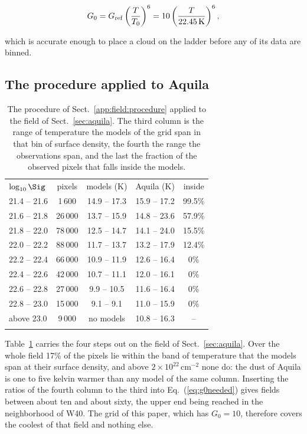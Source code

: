\begin{equation}
   G_0 = G_{\rm ref} \left( \frac{T}{T_0} \right)^{6} = 10 \left( \frac{T}{22.45\,{\rm K}} \right)^{6} ,
\label{eq:g0quick}
\end{equation}

which is accurate enough to place a cloud on the ladder before any of its data are binned.

\subsection{The procedure applied to Aquila}
\label{app:field:aquila}

\begin{table}
\caption{The procedure of Sect.~\ref{app:field:procedure} applied to the field of Sect.~\ref{sec:aquila}.  The third column is the
range of temperature the models of the grid span in that bin of surface density, the fourth the range the observations span, and
the last the fraction of the observed pixels that falls inside the models.}
\label{tab:g0aquila}
\centering
\begin{tabular}{lcccc}
\hline\hline
\noalign{\smallskip}
$\log_{10}\Sig$ & pixels & models (K) & Aquila (K) & inside \\
\noalign{\smallskip}
\hline
\noalign{\smallskip}
21.4 -- 21.6 &  1\,600 & 14.9 -- 17.3 & 15.9 -- 17.2 & 99.5{\%} \\
21.6 -- 21.8 & 26\,000 & 13.7 -- 15.9 & 14.8 -- 23.6 & 57.9{\%} \\
21.8 -- 22.0 & 78\,000 & 12.5 -- 14.7 & 14.1 -- 24.0 & 15.5{\%} \\
22.0 -- 22.2 & 88\,000 & 11.7 -- 13.7 & 13.2 -- 17.9 & 12.4{\%} \\
22.2 -- 22.4 & 66\,000 & 10.9 -- 11.9 & 12.6 -- 16.4 &  0{\%} \\
22.4 -- 22.6 & 42\,000 & 10.7 -- 11.1 & 12.0 -- 16.1 &  0{\%} \\
22.6 -- 22.8 & 27\,000 &  9.9 -- 10.5 & 11.6 -- 16.4 &  0{\%} \\
22.8 -- 23.0 & 15\,000 &  9.1 --  9.1 & 11.0 -- 15.9 &  0{\%} \\
above 23.0   &  9\,000 & no models    & 10.8 -- 16.3 & --      \\
\noalign{\smallskip}
\hline
\end{tabular}
\end{table}

Table~\ref{tab:g0aquila} carries the four steps out on the field of Sect.~\ref{sec:aquila}.  Over the whole field 17{\%} of the
pixels lie within the band of temperature that the models span at their surface density, and above $2{\times}10^{22}$\,cm$^{-2}$
none do: the dust of Aquila is one to five kelvin warmer than any model of the same column.  Inserting the ratios of the fourth
column to the third into Eq.~(\ref{eq:g0needed}) gives fields between about ten and about sixty, the upper end being reached in
the neighborhood of W40.  The grid of this paper, which has $G_0 = 10$, therefore covers the coolest of that field and nothing
else.

